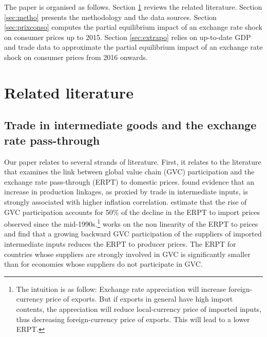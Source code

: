 \documentclass[11pt,a4paper]{article}
\begin{document}
The paper is organised as follows.
Section \ref{sec:lit} reviews the related literature.
Section \ref{sec:metho} presents the methodology and the data sources.
Section \ref{sec:prixconso} computes the partial equilibrium impact of an exchange rate shock on consumer prices up to 2015. 
Section \ref{sec:extrapo} relies on up-to-date GDP and trade data to approximate the partial equilibrium impact of an exchange rate shock on consumer prices from 2016 onwards.


\label{sec:intro}


\section{Related literature}
\label{sec:lit}

\subsection{Trade in intermediate goods and the exchange rate pass-through} 

Our paper relates to several strands of literature.
First, it relates to the literature that examines the link between global value chain (GVC) participation and the exchange rate pass-through (ERPT) to domestic prices. \cite{DeSoyres2018} found evidence that an increase in production linkages, as proxied by trade in intermediate inputs, is strongly associated with higher inflation correlation. 
\cite{Georgiadis2019} estimate that the rise of GVC participation accounts for 50\% of the decline in the ERPT to import prices observed since the mid-1990s.\footnote{The intuition is as follow: Exchange rate appreciation will increase foreign-currency price of exports. But if exports in general have high import contents, the appreciation will reduce local-currency price of imported inputs, thus decreasing foreign-currency price of exports. This will lead to a lower ERPT. }
\cite{Hagemejer2020} works on the non linearity of the ERPT to prices and find that a growing backward GVC participation of the suppliers of imported intermediate inputs reduces the ERPT to producer prices. The ERPT for countries whose suppliers are strongly involved in GVC is significantly smaller than for economies whose suppliers do not participate in GVC. 
\end{document}
